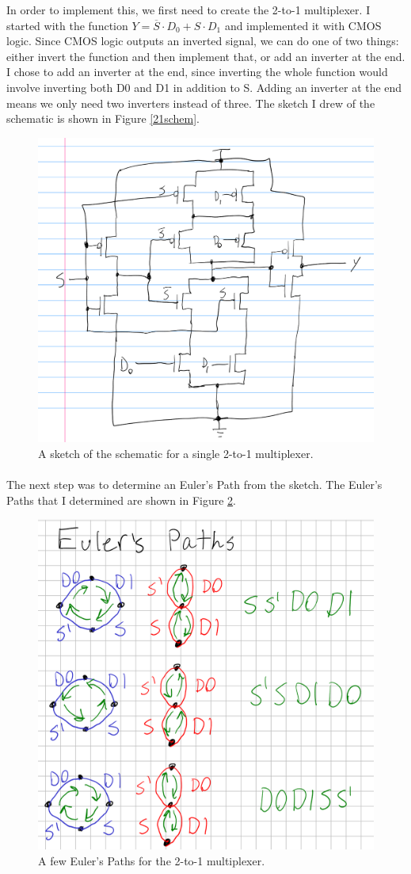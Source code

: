\documentclass{article}
\begin{document}
  In order to implement this, we first need to create the 2-to-1 multiplexer. I started with the function $Y=\overline{S}\cdot D_0+S\cdot D_1$ and implemented it with CMOS logic. Since CMOS logic outputs an inverted signal, we can do one of two things: either invert the function and then implement that, or add an inverter at the end. I chose to add an inverter at the end, since inverting the whole function would involve inverting both D0 and D1 in addition to S. Adding an inverter at the end means we only need two inverters instead of three. The sketch I drew of the schematic is shown in Figure \ref{21schem}.


  \begin{figure}[H]
    \centering
    \includegraphics[width=0.5\linewidth, frame]{screenshots/21schem.png}
    \caption{A sketch of the schematic for a single 2-to-1 multiplexer.}
    \label{fig:21schem}
  \end{figure}

  \paragraph{}
  The next step was to determine an Euler's Path from the sketch. The Euler's Paths that I determined are shown in Figure \ref{fig:euler}.


  \begin{figure}[H]
    \centering
    \includegraphics[width=0.5\linewidth, frame]{screenshots/euler.png}
    \caption{A few Euler's Paths for the 2-to-1 multiplexer.}
    \label{fig:euler}
  \end{figure}
\end{document}
